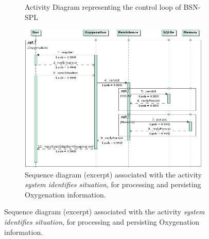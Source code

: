 \begin{figure}[!hbt] 
  \vspace{0.8cm}
  \begin{subfigure}[c]{1.0\textwidth}
  \centering
    
    
    \vspace{0.7cm}
    \caption{Activity Diagram representing the control loop of BSN-SPL}
    \label{fig:bsnControlLoop}
  \end{subfigure}

  \vspace{1cm}
  
  \begin{subfigure}[c]{0.95\columnwidth}
  \centering
    \includegraphics[width=0.7\columnwidth]{img/sd-oxygenation}
    \caption{Sequence diagram (excerpt) associated with the activity
	    \textit{system identifies situation}, for processing and persisting
	    Oxygenation information.} 
    \label{fig:oxygenationSituation} 
  \end{subfigure}
  \label{fig:bsnBehavioralDiagrams}

  \vspace{1cm}
  

\end{figure}
